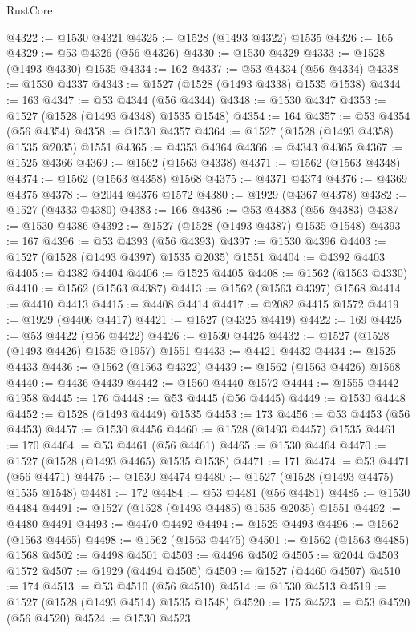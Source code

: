 \begin{lexlean}{RustCore}
\begin{coremodule}
@4322 := @1530 @4321
@4325 := @1528 (@1493 @4322) @1535
@4326 := 165
@4329 := @53 @4326 (@56 @4326)
@4330 := @1530 @4329
@4333 := @1528 (@1493 @4330) @1535
@4334 := 162
@4337 := @53 @4334 (@56 @4334)
@4338 := @1530 @4337
@4343 := @1527 (@1528 (@1493 @4338) @1535 @1538)
@4344 := 163
@4347 := @53 @4344 (@56 @4344)
@4348 := @1530 @4347
@4353 := @1527 (@1528 (@1493 @4348) @1535 @1548)
@4354 := 164
@4357 := @53 @4354 (@56 @4354)
@4358 := @1530 @4357
@4364 := @1527 (@1528 (@1493 @4358) @1535 @2035) @1551
@4365 := @4353 @4364
@4366 := @4343 @4365
@4367 := @1525 @4366
@4369 := @1562 (@1563 @4338)
@4371 := @1562 (@1563 @4348)
@4374 := @1562 (@1563 @4358) @1568
@4375 := @4371 @4374
@4376 := @4369 @4375
@4378 := @2044 @4376 @1572
@4380 := @1929 (@4367 @4378)
@4382 := @1527 (@4333 @4380)
@4383 := 166
@4386 := @53 @4383 (@56 @4383)
@4387 := @1530 @4386
@4392 := @1527 (@1528 (@1493 @4387) @1535 @1548)
@4393 := 167
@4396 := @53 @4393 (@56 @4393)
@4397 := @1530 @4396
@4403 := @1527 (@1528 (@1493 @4397) @1535 @2035) @1551
@4404 := @4392 @4403
@4405 := @4382 @4404
@4406 := @1525 @4405
@4408 := @1562 (@1563 @4330)
@4410 := @1562 (@1563 @4387)
@4413 := @1562 (@1563 @4397) @1568
@4414 := @4410 @4413
@4415 := @4408 @4414
@4417 := @2082 @4415 @1572
@4419 := @1929 (@4406 @4417)
@4421 := @1527 (@4325 @4419)
@4422 := 169
@4425 := @53 @4422 (@56 @4422)
@4426 := @1530 @4425
@4432 := @1527 (@1528 (@1493 @4426) @1535 @1957) @1551
@4433 := @4421 @4432
@4434 := @1525 @4433
@4436 := @1562 (@1563 @4322)
@4439 := @1562 (@1563 @4426) @1568
@4440 := @4436 @4439
@4442 := @1560 @4440 @1572
@4444 := @1555 @4442 @1958
@4445 := 176
@4448 := @53 @4445 (@56 @4445)
@4449 := @1530 @4448
@4452 := @1528 (@1493 @4449) @1535
@4453 := 173
@4456 := @53 @4453 (@56 @4453)
@4457 := @1530 @4456
@4460 := @1528 (@1493 @4457) @1535
@4461 := 170
@4464 := @53 @4461 (@56 @4461)
@4465 := @1530 @4464
@4470 := @1527 (@1528 (@1493 @4465) @1535 @1538)
@4471 := 171
@4474 := @53 @4471 (@56 @4471)
@4475 := @1530 @4474
@4480 := @1527 (@1528 (@1493 @4475) @1535 @1548)
@4481 := 172
@4484 := @53 @4481 (@56 @4481)
@4485 := @1530 @4484
@4491 := @1527 (@1528 (@1493 @4485) @1535 @2035) @1551
@4492 := @4480 @4491
@4493 := @4470 @4492
@4494 := @1525 @4493
@4496 := @1562 (@1563 @4465)
@4498 := @1562 (@1563 @4475)
@4501 := @1562 (@1563 @4485) @1568
@4502 := @4498 @4501
@4503 := @4496 @4502
@4505 := @2044 @4503 @1572
@4507 := @1929 (@4494 @4505)
@4509 := @1527 (@4460 @4507)
@4510 := 174
@4513 := @53 @4510 (@56 @4510)
@4514 := @1530 @4513
@4519 := @1527 (@1528 (@1493 @4514) @1535 @1548)
@4520 := 175
@4523 := @53 @4520 (@56 @4520)
@4524 := @1530 @4523

\end{coremodule}
\end{lexlean}
